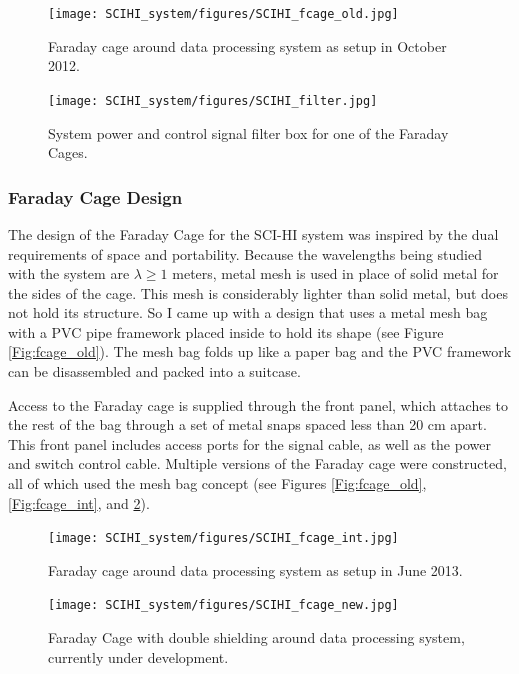 \begin{figure}[htb]
\centering
\begin{minipage}[b]{0.36\textwidth}
\centering
\texttt{[image: SCIHI\_system/figures/SCIHI\_fcage\_old.jpg]}
\caption{Faraday cage around data processing system as setup in October 2012.}
\label{Fig:fcage_old}
\end{minipage}%
\begin{minipage}[b]{0.02\textwidth}
\hspace{1cm}
\end{minipage}%
\begin{minipage}[b]{0.58\textwidth}
\centering
\texttt{[image: SCIHI\_system/figures/SCIHI\_filter.jpg]}
\caption{System power and control signal filter box for one of the Faraday Cages.}
\label{Fig:fcage_filter}
\end{minipage}
\end{figure}

\subsubsection{Faraday Cage Design}

The design of the Faraday Cage for the SCI-HI system was inspired by the dual requirements of space and portability. Because the wavelengths being studied with the system are $\lambda \geq 1$ meters, metal mesh is used in place of solid metal for the sides of the cage. This mesh is considerably lighter than solid metal, but does not hold its structure. So I came up with a design that uses a metal mesh bag with a PVC pipe framework placed inside to hold its shape (see Figure \ref{Fig:fcage_old}). The mesh bag folds up like a paper bag and the PVC framework can be disassembled and packed into a suitcase. 

Access to the Faraday cage is supplied through the front panel, which attaches to the rest of the bag through a set of metal snaps spaced less than 20 cm apart. This front panel includes access ports for the signal cable, as well as the power and switch control cable. Multiple versions of the Faraday cage were constructed, all of which used the mesh bag concept (see Figures \ref{Fig:fcage_old}, \ref{Fig:fcage_int}, and \ref{Fig:fcage_new}). 

\begin{figure}[htb]
\centering
\begin{minipage}[b]{0.44\textwidth}
\centering
\texttt{[image: SCIHI\_system/figures/SCIHI\_fcage\_int.jpg]}
\caption{Faraday cage around data processing system as setup in June 2013.}
\label{Fig:fcage_int}
\end{minipage}%
\begin{minipage}[b]{0.02\textwidth}
\hspace{1cm}
\end{minipage}%
\begin{minipage}[b]{0.50\textwidth}
\centering
\texttt{[image: SCIHI\_system/figures/SCIHI\_fcage\_new.jpg]}
\caption{Faraday Cage with double shielding around data processing system, currently under development.}
\label{Fig:fcage_new}
\end{minipage}
\end{figure}

